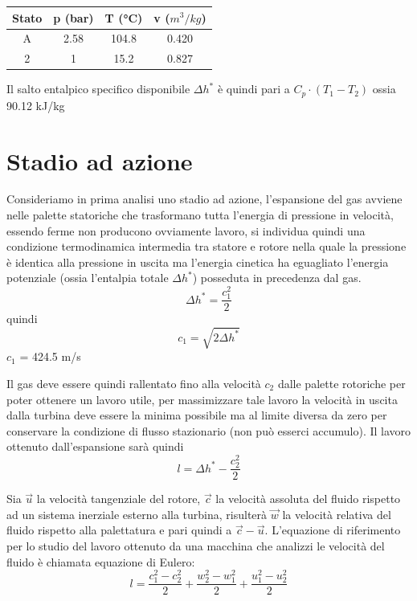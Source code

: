 \documentclass[a4paper,12pt]{article}
\begin{document}
\begin{center}
    \begin{tabular}{c|c|c|c}
        Stato   &p (bar)    &T (°C) &v ($m^3/kg$) \\ \hline
        A       &2.58       &104.8  &0.420  \\
        2       &1          &15.2   &0.827  
    \end{tabular}
\end{center}
Il salto entalpico specifico disponibile $\Delta h^*$ è quindi pari a $C_p \cdot (T_1-T_2)$ ossia 90.12 kJ/kg

\section{Stadio ad azione}
\label{sec:stadio_ad_azione}
Consideriamo in prima analisi uno stadio ad azione, l'espansione del gas avviene nelle palette statoriche che trasformano tutta l'energia di pressione in velocità,
essendo ferme non producono ovviamente lavoro, si individua quindi una condizione termodinamica intermedia tra statore e rotore nella quale la pressione è identica
alla pressione in uscita ma l'energia cinetica ha eguagliato l'energia potenziale (ossia l'entalpia totale $\Delta h^*$) posseduta in precedenza dal gas.
\begin{equation}
    \label{eq:entalpia_stadio_azione}
    \Delta h^* = \frac{c_1^2}{2}
\end{equation}
quindi
\begin{equation}
    \label{eq:vel_stadio_azione}
    c_1 = \sqrt{2\Delta h^*}    
\end{equation}
$c_1$ = 424.5 m/s

Il gas deve essere quindi rallentato fino alla velocità $c_2$ dalle palette rotoriche per poter ottenere un lavoro utile, per massimizzare tale lavoro la velocità
in uscita dalla turbina deve essere la minima possibile ma al limite diversa da zero per conservare la condizione di flusso stazionario (non può esserci accumulo).
Il lavoro ottenuto dall'espansione sarà quindi
\begin{equation}
    \label{eq:lavoro_ad_azione}
    l = \Delta h^* - \frac{c_2^2}{2}
\end{equation}

Sia $\vec u$ la velocità tangenziale del rotore, $\vec c$ la velocità assoluta del fluido rispetto ad un sistema inerziale esterno alla turbina,
risulterà $\vec w$ la velocità relativa del fluido rispetto alla palettatura e pari quindi a  $\vec c - \vec u$.
L'equazione di riferimento per lo studio del lavoro ottenuto da una macchina che analizzi le velocità del fluido è chiamata equazione di Eulero:
\begin{equation}
    \label{eq:Eulero}
    l = \frac{c_1^2-c_2^2}{2} + \frac{w_2^2-w_1^2}{2} + \frac{u_1^2 - u_2^2}{2}
\end{equation}
\end{document}
